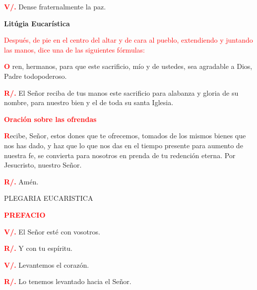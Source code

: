 \documentclass[12pt, letterpaper]{report}
\begin{document}
\noindent
\Large {\bfseries \textcolor{red}{V/.}} \hspace{0.5cm} Dense fraternalmente la paz. 

\newpage

\begin{center}
\Huge {\bfseries Lit\'ugia Eucar\'istica}
\end{center}

\large {\textcolor{red}{Despu\'es, de pie en el centro del altar y de cara al pueblo, extendiendo y juntando las manos, dice una de las siguientes f\'ormulas:}}

\lettrine[lines=1]{\bfseries \textcolor{red}{O}}{} \Large ren, hermanos, para que este sacrificio, m\'io y de ustedes, sea agradable a Dios, Padre todopoderoso. 

\noindent
\Large {\bfseries \textcolor{red}{R/.}} \hspace{0.5cm} El Se\~nor reciba de tus manos este sacrificio para alabanza y gloria de su nombre, para nuestro bien y el de toda su santa Iglesia.

\Large {\bfseries \textcolor{red}{Oraci\'on sobre las ofrendas}}

\lettrine[lines=1]{\bfseries \textcolor{red}{R}}{}\Large ecibe, Se\~nor, estos dones que te ofrecemos, tomados de los mismos bienes que nos has dado, y haz que lo que nos das en el tiempo presente para aumento de nuestra fe, se convierta para nosotros en prenda de tu redenci\'on eterna. Por Jesucristo, nuestro Se\~nor.

\noindent
\Large {\bfseries \textcolor{red}{R/.}} \hspace{0.5cm} Am\'en.

\begin{center}
\Large PLEGARIA EUCARISTICA
\end{center}


\Large {\bfseries \textcolor{red}{PREFACIO}}

\noindent
\Large {\bfseries \textcolor{red}{V/.}} \hspace{0.5cm} El Se\~nor est\'e con vosotros.

\noindent
\Large {\bfseries \textcolor{red}{R/.}} \hspace{0.5cm} Y con tu esp\'iritu. 

\noindent
\Large {\bfseries \textcolor{red}{V/.}} \hspace{0.5cm} Levantemos el coraz\'on.

\noindent
\Large {\bfseries \textcolor{red}{R/.}} \hspace{0.5cm} Lo tenemos levantado hacia el Se\~nor. 
\end{document}
